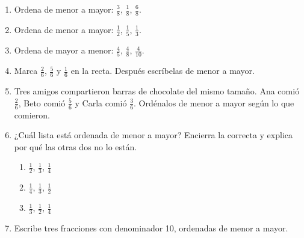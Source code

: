 \begin{wbpractice}
\begin{enumerate}
\item Ordena de menor a mayor: $\frac{3}{8}$, $\frac{1}{8}$, $\frac{6}{8}$.

\item Ordena de menor a mayor: $\frac{1}{2}$, $\frac{1}{5}$, $\frac{1}{3}$.

\item Ordena de mayor a menor: $\frac{4}{5}$, $\frac{4}{8}$, $\frac{4}{10}$.

\item Marca $\frac{2}{6}$, $\frac{5}{6}$ y $\frac{1}{6}$ en la recta. Después escríbelas de menor a mayor.


\item Tres amigos compartieron barras de chocolate del mismo tamaño. Ana comió $\frac{2}{6}$, Beto comió $\frac{5}{6}$ y Carla comió $\frac{3}{6}$. Ordénalos de menor a mayor según lo que comieron.

\item ¿Cuál lista está ordenada de menor a mayor? Encierra la correcta y explica por qué las otras dos no lo están.
  \begin{enumerate}
  \item $\frac{1}{2}$, $\frac{1}{3}$, $\frac{1}{4}$
  \item $\frac{1}{4}$, $\frac{1}{3}$, $\frac{1}{2}$
  \item $\frac{1}{3}$, $\frac{1}{2}$, $\frac{1}{4}$
  \end{enumerate}

\item Escribe tres fracciones con denominador 10, ordenadas de menor a mayor.
\end{enumerate}
\end{wbpractice}

